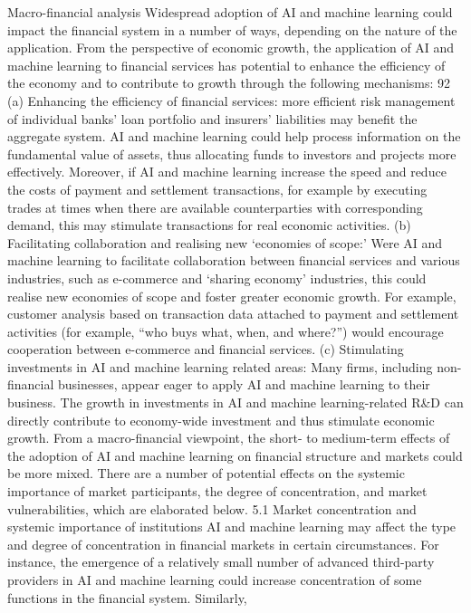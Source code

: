 \documentclass[]{article}
\begin{document}
Macro-financial analysis Widespread adoption of AI and machine learning
could impact the financial system in a number of ways, depending on the
nature of the application. From the perspective of economic growth, the
application of AI and machine learning to financial services has
potential to enhance the efficiency of the economy and to contribute to
growth through the following mechanisms: 92 (a) Enhancing the efficiency
of financial services: more efficient risk management of individual
banks' loan portfolio and insurers' liabilities may benefit the
aggregate system. AI and machine learning could help process information
on the fundamental value of assets, thus allocating funds to investors
and projects more effectively. Moreover, if AI and machine learning
increase the speed and reduce the costs of payment and settlement
transactions, for example by executing trades at times when there are
available counterparties with corresponding demand, this may stimulate
transactions for real economic activities. (b) Facilitating
collaboration and realising new `economies of scope:' Were AI and
machine learning to facilitate collaboration between financial services
and various industries, such as e-commerce and `sharing economy'
industries, this could realise new economies of scope and foster greater
economic growth. For example, customer analysis based on transaction
data attached to payment and settlement activities (for example, ``who
buys what, when, and where?'') would encourage cooperation between
e-commerce and financial services. (c) Stimulating investments in AI and
machine learning related areas: Many firms, including non-financial
businesses, appear eager to apply AI and machine learning to their
business. The growth in investments in AI and machine learning-related
R\&D can directly contribute to economy-wide investment and thus
stimulate economic growth. From a macro-financial viewpoint, the short-
to medium-term effects of the adoption of AI and machine learning on
financial structure and markets could be more mixed. There are a number
of potential effects on the systemic importance of market participants,
the degree of concentration, and market vulnerabilities, which are
elaborated below. 5.1 Market concentration and systemic importance of
institutions AI and machine learning may affect the type and degree of
concentration in financial markets in certain circumstances. For
instance, the emergence of a relatively small number of advanced
third-party providers in AI and machine learning could increase
concentration of some functions in the financial system. Similarly,
\end{document}
